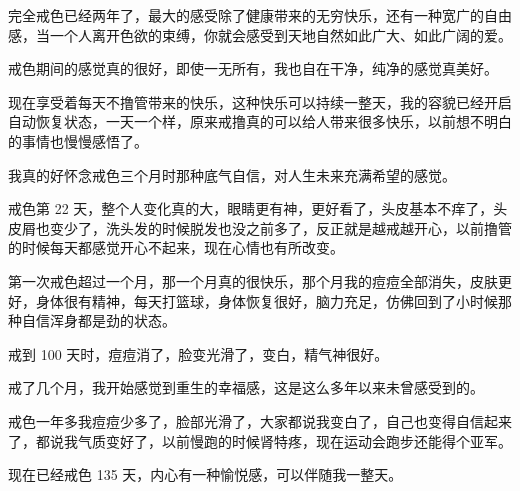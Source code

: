 \begin{case}[戒色]
    完全戒色已经两年了，最大的感受除了健康带来的无穷快乐，还有一种宽广的自由感，当一个人离开色欲的束缚，你就会感受到天地自然如此广大、如此广阔的爱。
\end{case}

\begin{case}[戒色]
    戒色期间的感觉真的很好，即使一无所有，我也自在干净，纯净的感觉真美好。
\end{case}

\begin{case}[戒色]
    现在享受着每天不撸管带来的快乐，这种快乐可以持续一整天，我的容貌已经开启自动恢复状态，一天一个样，原来戒撸真的可以给人带来很多快乐，以前想不明白的事情也慢慢感悟了。
\end{case}

\begin{case}[戒色]
    我真的好怀念戒色三个月时那种底气自信，对人生未来充满希望的感觉。
\end{case}

\begin{case}[戒色]
    戒色第 22 天，整个人变化真的大，眼睛更有神，更好看了，头皮基本不痒了，头皮屑也变少了，洗头发的时候脱发也没之前多了，反正就是越戒越开心，以前撸管的时候每天都感觉开心不起来，现在心情也有所改变。
\end{case}

\begin{case}[戒色]
    第一次戒色超过一个月，那一个月真的很快乐，那个月我的痘痘全部消失，皮肤更好，身体很有精神，每天打篮球，身体恢复很好，脑力充足，仿佛回到了小时候那种自信浑身都是劲的状态。
\end{case}

\begin{case}[戒色]
    戒到 100 天时，痘痘消了，脸变光滑了，变白，精气神很好。
\end{case}

\begin{case}[戒色]
    戒了几个月，我开始感觉到重生的幸福感，这是这么多年以来未曾感受到的。
\end{case}

\begin{case}[戒色]
    戒色一年多我痘痘少多了，脸部光滑了，大家都说我变白了，自己也变得自信起来了，都说我气质变好了，以前慢跑的时候肾特疼，现在运动会跑步还能得个亚军。
\end{case}

\begin{case}[戒色]
    现在已经戒色 135 天，内心有一种愉悦感，可以伴随我一整天。
\end{case}

